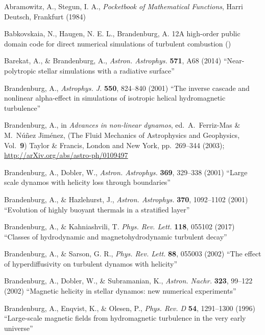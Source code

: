 \documentclass[\mydriver,12pt,twoside,notitlepage,a4paper]{article}
\begin{document}
\begin{thebibliography}{99}

 Abramowitz, A., Stegun, I. A.,
  \emph{Pocketbook of Mathematical Functions\/},
  Harri Deutsch, Frankfurt (1984)

 Babkovskaia, N., Haugen, N. E. L., Brandenburg, A.
{12}{A high-order public domain code for direct numerical simulations of turbulent combustion}
()

 Barekat, A., \& Brandenburg, A.,
  \emph{Astron. Astrophys.} \textbf{571}, A68 (2014)
  ``Near-polytropic stellar simulations with a radiative surface''

 Brandenburg, A.,
  \emph{Astrophys. J.} \textbf{550}, 824--840 (2001)
  ``The inverse cascade and nonlinear alpha-effect in simulations
  of isotropic helical hydromagnetic turbulence''

 Brandenburg, A., in \emph{Advances in non-linear dynamos},
  ed.\ A.\ Ferriz-Mas \& M.\ N\'u\~nez Jim\'enez,
  (The Fluid Mechanics of Astrophysics and Geophysics, Vol.\ {\bf9})
  Taylor \& Francis, London and New York, pp.~269--344 (2003);
  \url{http://arXiv.org/abs/astro-ph/0109497}

 Brandenburg, A., Dobler, W.,
  \emph{Astron. Astrophys.} \textbf{369}, 329--338 (2001)
  ``Large scale dynamos with helicity loss through boundaries''

 Brandenburg, A., \& Hazlehurst, J.,
  \emph{Astron. Astrophys.} \textbf{370}, 1092--1102 (2001)
  ``Evolution of highly buoyant thermals in a stratified layer''

 Brandenburg, A., \& Kahniashvili, T.
  \emph{Phys. Rev. Lett.} \textbf{118}, 055102 (2017)
  ``Classes of hydrodynamic and magnetohydrodynamic turbulent decay''

 Brandenburg, A., \& Sarson, G. R.,
  \emph{Phys. Rev. Lett.} \textbf{88}, 055003 (2002)
  ``The effect of hyperdiffusivity on turbulent dynamos with helicity''

Brandenburg, A., Dobler, W., \& Subramanian, K.,
  \emph{Astron. Nachr.} \textbf{323}, 99--122 (2002)
  ``Magnetic helicity in stellar dynamos: new numerical experiments''

Brandenburg, A., Enqvist, K., \& Olesen, P.,
  \emph{Phys. Rev. D} \textbf{54}, 1291--1300 (1996)
  ``Large-scale magnetic fields from hydromagnetic turbulence
in the very early universe''


\end{thebibliography}
\end{document}
